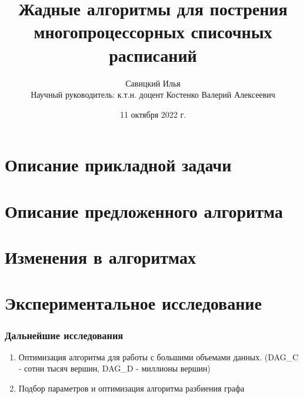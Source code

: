 \documentclass[hyperref=unicode, aspectratio=169]{beamer}
\title[]{Жадные алгоритмы для пострения многопроцессорных списочных расписаний}
\author[]{Савицкий Илья\\Научный руководитель: к.т.н. доцент Костенко Валерий Алексеевич}
\date{11 октября 2022 г.}
\begin{document}
\begin{frame}
    \titlepage
\end{frame}

% 

\section{Описание прикладной задачи}


% 

\section{Описание предложенного алгоритма}


% 

% 

% 

\section{Изменения в алгоритмах}


\section{Экспериментальное исследование}


\begin{frame}
    \frametitle{Дальнейшие исследования}
    \begin{enumerate}
        \item Оптимизация алгоритма для работы с большими объемами данных. (DAG\_C - сотни тысяч вершин, DAG\_D - миллионы вершин)
        \item Подбор параметров и оптимизация алгоритма разбиения графа 
    \end{enumerate}
\end{frame}
\end{document}
